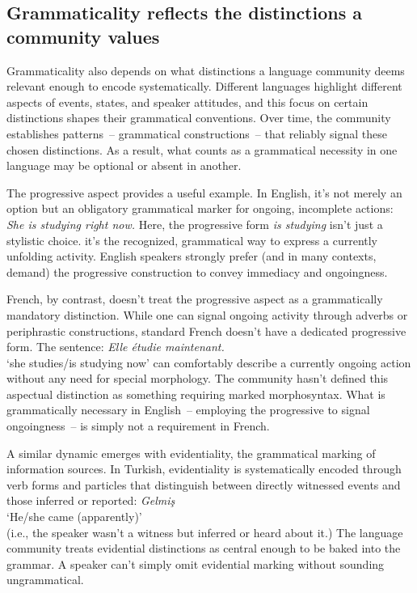\documentclass[12pt,letterpaper]{article}
\begin{document}
\subsection{Grammaticality reflects the distinctions a community values}\label{sec:community-values}

Grammaticality also depends on what distinctions a language community deems relevant enough to encode systematically. Different languages highlight different aspects of events, states, and speaker attitudes, and this focus on certain distinctions shapes their grammatical conventions. Over time, the community establishes patterns~-- grammatical constructions~-- that reliably signal these chosen distinctions. As a result, what counts as a grammatical necessity in one language may be optional or absent in another.

The progressive aspect provides a useful example. In English, it's not merely an option but an obligatory grammatical marker for ongoing, incomplete actions:
\ea
\textit{She is studying right now.}
\z
Here, the progressive form \textit{is studying} isn't just a stylistic choice. it's the recognized, grammatical way to express a currently unfolding activity. English speakers strongly prefer (and in many contexts, demand) the progressive construction to convey immediacy and ongoingness.

French, by contrast, doesn't treat the progressive aspect as a grammatically mandatory distinction. While one can signal ongoing activity through adverbs or periphrastic constructions, standard French doesn't have a dedicated progressive form. The sentence:
\ea
\textit{Elle étudie maintenant.}\\
`she studies/is studying now'
\z
can comfortably describe a currently ongoing action without any need for special morphology. The community hasn't defined this aspectual distinction as something requiring marked morphosyntax. What is grammatically necessary in English~-- employing the progressive to signal ongoingness~-- is simply not a requirement in French.

A similar dynamic emerges with evidentiality, the grammatical marking of information sources. In Turkish, evidentiality is systematically encoded through verb forms and particles that distinguish between directly witnessed events and those inferred or reported:
\ea
\textit{Gelmiş}\\
`He/she came (apparently)' \\(i.e., the speaker wasn't a witness but inferred or heard about it.)
\z
The language community treats evidential distinctions as central enough to be baked into the grammar. A speaker can't simply omit evidential marking without sounding ungrammatical.
\end{document}
